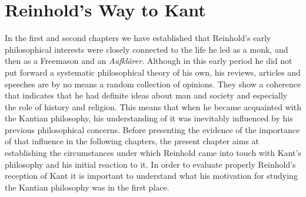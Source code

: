 
\chapter{Reinhold's Way to Kant}


In the first and second chapters we have established that Reinhold's early philosophical interests were closely connected to the life he led as a monk, and then as a Freemason and an \textit{Aufkl\"{a}rer}. Although in this early period he did not put forward a systematic philosophical theory of his own, his reviews, articles and speeches are by no means a random collection of opinions. They show a coherence that indicates that he had definite ideas about man and society and especially the role of history and religion. This means that when he became acquainted with the Kantian philosophy, his understanding of it was inevitably influenced by his previous philosophical concerns. Before presenting the evidence of the importance of that influence in the following chapters, the present chapter aims at establishing the circumstances under which Reinhold came into touch with Kant's philosophy and his initial reaction to it. In order to evaluate properly Reinhold's reception of Kant it is important to understand what his motivation for studying the Kantian philosophy was in the first place. 

